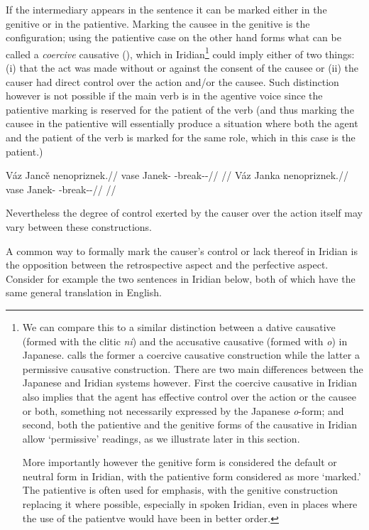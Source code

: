 If the intermediary appears in the sentence it can be marked either in the
genitive or in the patientive. Marking the causee in the genitive is the
 configuration; using the patientive case on the other hand forms
what can be called a \emph{coercive} causative
(\cite{shibatani1990,lehmann2006}), which in Iridian\footnote{We can compare
this to a similar distinction between a dative causative (formed with the clitic
\emph{ni}) and the accusative causative (formed with \emph{o}) in
Japanese. \textcite{lehmann2006} calls the former a coercive
causative construction while the latter a permissive causative construction.
There are two main differences between the Japanese and Iridian
systems however. First the coercive causative in Iridian also implies that the
agent has effective control over the action or the causee or both, something not
necessarily expressed by the Japanese \emph{o}-form; and second,
both the patientive and the genitive forms of the causative in Iridian allow
`permissive' readings, as we illustrate later in this section.

More importantly however the genitive form is considered the default or neutral
form in Iridian, with the patientive form considered as more `marked.' The
patientive is often used for emphasis, with the genitive construction replacing
it where possible, especially in spoken Iridian, even in places where the use of
the patientve would have been in better order. } could imply either of two
things: (i) that the act was made without or against the consent of the causee
or (ii) the causer had direct control over the action and/or the causee. Such
distinction however is not possible if the main verb is in the agentive voice
since the patientive marking is reserved for the patient of the verb (and thus
marking the causee in the patientive will essentially produce a situation where
both the agent and the patient of the verb is marked for the same role, which in
this case is the patient.)

\pex
\a
\begingl
\gla Váz Jancě nenopriznek.//
\glb vase Janek-\Gen{} \Caus{}-break-\Pv{}-\Pf{}//
\glft {}//
\endgl
\a
\begingl
\gla Váz Janka nenopriznek.//
\glb vase Janek-\Acc{} \Caus{}-break-\Pv{}-\Pf{}//
\glft {}//
\endgl
\xe


Nevertheless the degree of control exerted by the causer over the action itself
may vary between these constructions.

A common way to formally mark the causer's control or lack thereof in Iridian is
the opposition between the retrospective aspect and the perfective aspect.
Consider for example the two sentences in Iridian below, both of which have the
same general translation in English.

